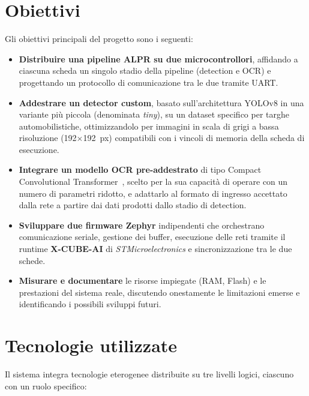 \section{Obiettivi}
\label{sec:obiettivi}

Gli obiettivi principali del progetto sono i seguenti:

\begin{itemize}
    \item \textbf{Distribuire una pipeline ALPR su due microcontrollori}, affidando a ciascuna scheda un singolo stadio della pipeline (detection e OCR) e progettando un protocollo di comunicazione tra le due tramite UART.
    \item \textbf{Addestrare un detector custom}, basato sull'architettura YOLOv8 in una variante più piccola (denominata \textit{tiny}), su un dataset specifico per targhe automobilistiche, ottimizzandolo per immagini in scala di grigi a bassa risoluzione (192$\times$192~px) compatibili con i vincoli di memoria della scheda di esecuzione.
    \item \textbf{Integrare un modello OCR pre-addestrato} di tipo Compact Convolutional Transformer~\cite{hassani_2021_cct}, scelto per la sua capacità di operare con un numero di parametri ridotto, e adattarlo al formato di ingresso accettato dalla rete a partire dai dati prodotti dallo stadio di detection.
    \item \textbf{Sviluppare due firmware Zephyr} indipendenti che orchestrano comunicazione seriale, gestione dei buffer, esecuzione delle reti tramite il runtime \textbf{X-CUBE-AI} di \textit{STMicroelectronics} e sincronizzazione tra le due schede.
    \item \textbf{Misurare e documentare} le risorse impiegate (RAM, Flash) e le prestazioni del sistema reale, discutendo onestamente le limitazioni emerse e identificando i possibili sviluppi futuri.
\end{itemize}

\newpage
\section{Tecnologie utilizzate}
\label{sec:tecnologie}

Il sistema integra tecnologie eterogenee distribuite su tre livelli logici, ciascuno con un ruolo specifico:

